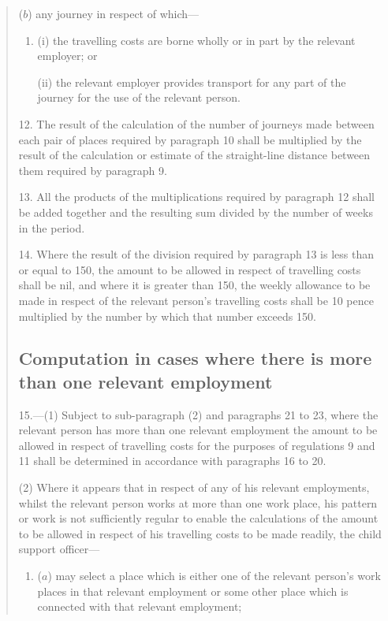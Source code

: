 \documentclass[12pt,a4paper]{article}
\begin{document}
\begin{quotation}
\begin{enumerate}
($b$) any journey in respect of which—
\begin{enumerate}\item[]
(i) the travelling costs are borne wholly or in part by the relevant employer; or

(ii) the relevant employer provides transport for any part of the journey for the use of the relevant person.
\end{enumerate}
\end{enumerate}

\medskip

12.  The result of the calculation of the number of journeys made between each pair of places required by paragraph 10 shall be multiplied by the result of the calculation or estimate of the straight-line distance between them required by paragraph 9.

\medskip

13.  All the products of the multiplications required by paragraph 12 shall be added together and the resulting sum divided by the number of weeks in the period.

\medskip

14.  Where the result of the division required by paragraph 13 is less than or equal to 150, the amount to be allowed in respect of travelling costs shall be nil, and where it is greater than 150, the weekly allowance to be made in respect of the relevant person’s travelling costs shall be 10 pence multiplied by the number by which that number exceeds 150.

\subsection*{Computation in cases where there is more than one relevant employment}

15.—(1) Subject to sub-paragraph (2) and paragraphs 21 to 23, where the relevant person has more than one relevant employment the amount to be allowed in respect of travelling costs for the purposes of regulations 9 and 11 shall be determined in accordance with paragraphs 16 to 20.

(2) Where it appears that in respect of any of his relevant employments, whilst the relevant person works at more than one work place, his pattern or work is not sufficiently regular to enable the calculations of the amount to be allowed in respect of his travelling costs to be made readily, the child support officer—
\begin{enumerate}\item[]
($a$) may select a place which is either one of the relevant person’s work places in that relevant employment or some other place which is connected with that relevant employment;


\end{enumerate}
\end{quotation}
\end{document}

